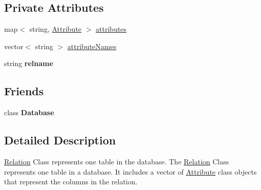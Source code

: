 \subsection*{Private Attributes}
\begin{DoxyCompactItemize}
\item 
map$<$ string, \hyperlink{class_attribute}{Attribute} $>$ \hyperlink{class_relation_ad505b043cf529432345433e6d4e2ded9}{attributes}
\item 
vector$<$ string $>$ \hyperlink{class_relation_ace8c91beafd208dcf6469b9b2425ecf7}{attribute\-Names}
\item 
\hypertarget{class_relation_a9dea0564435560991f70344788ac3b22}{string {\bfseries relname}}\label{class_relation_a9dea0564435560991f70344788ac3b22}

\end{DoxyCompactItemize}
\subsection*{Friends}
\begin{DoxyCompactItemize}
\item 
\hypertarget{class_relation_a6efef52d7a939622bbc934ff6b90ffe0}{class {\bfseries Database}}\label{class_relation_a6efef52d7a939622bbc934ff6b90ffe0}

\end{DoxyCompactItemize}


\subsection{Detailed Description}
\hyperlink{class_relation}{Relation} Class represents one table in the database. The \hyperlink{class_relation}{Relation} Class represents one table in a database. It includes a vector of \hyperlink{class_attribute}{Attribute} class objects that represent the columns in the relation. 

